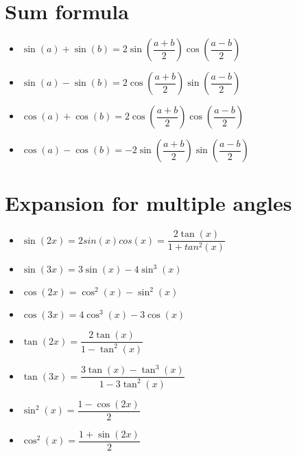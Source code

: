 \documentclass{article}
\begin{document}
\maketitle
\section {Sum formula}
\begin{itemize}
  \item $\sin(a) + \sin(b) = 2\sin\left(\dfrac{a + b}{2}\right)\cos\left(\dfrac{a - b}{2}\right)$
  \item $\sin(a) - \sin(b) = 2\cos\left(\dfrac{a + b}{2}\right)\sin\left(\dfrac{a - b}{2}\right)$
  \item $\cos(a) + \cos(b) = 2\cos\left(\dfrac{a + b}{2}\right)\cos\left(\dfrac{a - b}{2}\right)$
  \item $\cos(a) - \cos(b) = -2\sin\left(\dfrac{a + b}{2}\right)\sin\left(\dfrac{a - b}{2}\right)$
\end{itemize}

\maketitle
\section {Expansion for multiple angles}

\begin{itemize}
  \item $\sin(2x) = 2sin(x)cos(x) = \dfrac{2\tan(x)}{1 + tan^2(x)}$
  \item $\sin(3x) = 3\sin(x) - 4\sin^3(x)$
  \item $\cos(2x) = \cos^2(x) - \sin^2(x)$
  \item $\cos(3x) = 4\cos^3(x) - 3\cos(x)$
  \item $\tan(2x) = \dfrac{2\tan(x)}{1 - \tan^2(x)}$
  \item $\tan(3x) = \dfrac{3\tan(x) - \tan^3(x)}{1 - 3\tan^2(x)}$
  \item $\sin^2(x) = \dfrac{1 - \cos(2x)}{2}$
  \item $\cos^2(x) = \dfrac{1 + \sin(2x)}{2}$  
\end{itemize}

\maketitle
\end{document}
